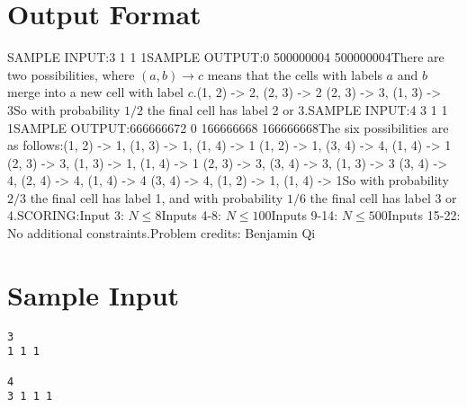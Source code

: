 \documentclass[12pt]{article}
\begin{document}
\section*{Output Format}
SAMPLE INPUT:3
1 1 1SAMPLE OUTPUT:0
500000004
500000004There are two possibilities, where $(a,b)\to c$ means that the cells with labels
$a$ and $b$ merge into a new cell with label $c$.(1, 2) -> 2, (2, 3) -> 2
(2, 3) -> 3, (1, 3) -> 3So with probability $1/2$ the final cell has label 2 or 3.SAMPLE INPUT:4
3 1 1 1SAMPLE OUTPUT:666666672
0
166666668
166666668The six possibilities are as follows:(1, 2) -> 1, (1, 3) -> 1, (1, 4) -> 1
(1, 2) -> 1, (3, 4) -> 4, (1, 4) -> 1
(2, 3) -> 3, (1, 3) -> 1, (1, 4) -> 1
(2, 3) -> 3, (3, 4) -> 3, (1, 3) -> 3
(3, 4) -> 4, (2, 4) -> 4, (1, 4) -> 4
(3, 4) -> 4, (1, 2) -> 1, (1, 4) -> 1So with probability $2/3$ the final cell has label 1, and with probability $1/6$
the final cell has label 3 or 4.SCORING:Input 3: $N\le 8$Inputs 4-8: $N\le 100$Inputs 9-14: $N\le 500$Inputs 15-22: No additional constraints.Problem credits: Benjamin Qi

\section*{Sample Input}
\begin{verbatim}
3
1 1 1

4
3 1 1 1
\end{verbatim}
\end{document}
